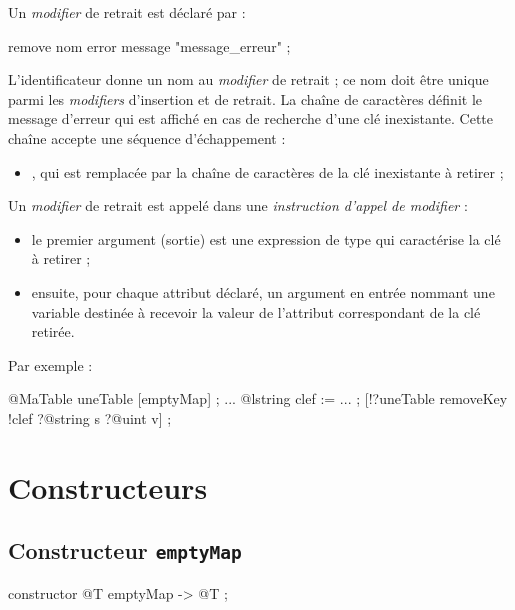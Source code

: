 Un \emph{modifier} de retrait est déclaré par :

\begin{galgascode}
remove nom error message "message_erreur" ;
\end{galgascode}

L'identificateur  donne un nom au \emph{modifier} de retrait ; ce nom doit être unique parmi les \emph{modifiers} d'insertion et de retrait. La chaîne de caractères  définit le message d'erreur qui est affiché en cas de recherche d'une clé inexistante. Cette chaîne accepte une séquence d'échappement :
\begin{itemize}
  \item {}, qui est remplacée par la chaîne de caractères de la clé inexistante à retirer ;
\end{itemize}


Un \emph{modifier} de retrait est appelé dans une \emph{instruction d'appel de modifier} :
\begin{itemize}
  \item le premier argument (sortie) est une expression de type  qui caractérise la clé à retirer ;
  \item ensuite, pour chaque attribut déclaré, un argument en entrée nommant une variable destinée à recevoir la valeur de l'attribut correspondant de la clé retirée.
\end{itemize}

Par exemple :
\begin{galgascode}
@MaTable uneTable [emptyMap] ;
...
@lstring clef := ... ;
[!?uneTable removeKey !clef ?@string s ?@uint v] ;
\end{galgascode}






\section{Constructeurs}

\subsection{Constructeur \texttt{emptyMap}}

\begin{galgascode}
constructor @T emptyMap -> @T ;
\end{galgascode}

